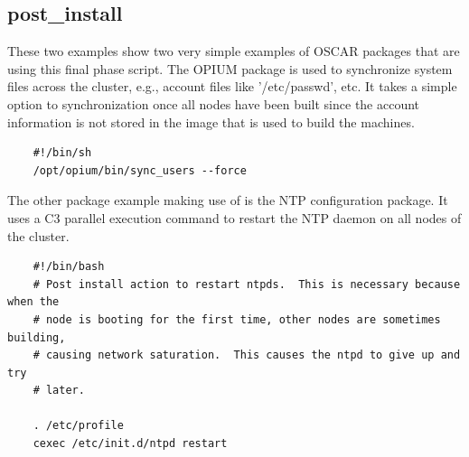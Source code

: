 \subsection{post\_install}

These two examples show two very simple examples of OSCAR packages that are
using this final phase script.  The OPIUM package is used to synchronize
system files across the cluster, e.g., account files like '/etc/passwd',
etc.  It takes a simple option to  synchronization once all
nodes have been built since the account information is not stored in the
image that is used to build the machines.

\begin{scriptsize}
\begin{verbatim}
    #!/bin/sh
    /opt/opium/bin/sync_users --force
\end{verbatim}
\end{scriptsize}


\noindent The other package example making use of  is the
NTP configuration package.  It uses a C3 parallel execution command to
restart the NTP daemon on all nodes of the cluster.

\begin{scriptsize}
\begin{verbatim}
    #!/bin/bash
    # Post install action to restart ntpds.  This is necessary because when the
    # node is booting for the first time, other nodes are sometimes building,
    # causing network saturation.  This causes the ntpd to give up and try
    # later.
  
    . /etc/profile
    cexec /etc/init.d/ntpd restart
\end{verbatim}
\end{scriptsize}
